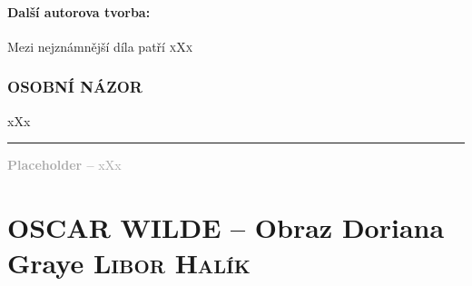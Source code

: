 \documentclass[A4paper]{extarticle} %
\begin{document}

\subsection*{Další autorova tvorba:}
\noindent 
Mezi nejznámnější díla patří \textsc{xXx}






\section*{OSOBNÍ NÁZOR}
\noindent 
xXx

\vfill

\noindent\begin{minipage}{\textwidth}
    \textcolor{darkgray}{\rule{\linewidth}{0.4pt}
    \footnotesize
    \textbf{Placeholder --} xXx
    }
\end{minipage}

\newpage


\changefontsize{8pt}

\part*{OSCAR WILDE -- Obraz Doriana Graye {\hfill \normalfont\tiny\textsc{Libor Halík}}}
\end{document}
